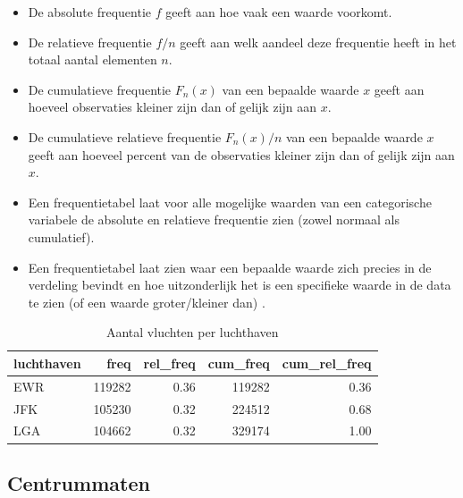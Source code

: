\documentclass[]{tufte-book}
\providecommand{\tightlist}{%
  \setlength{\itemsep}{0pt}\setlength{\parskip}{0pt}}
\begin{document}
\begin{itemize}
\tightlist
\item
  De absolute frequentie \(f\) geeft aan hoe vaak een waarde voorkomt.
\item
  De relatieve frequentie \(f/n\) geeft aan welk aandeel deze frequentie heeft in het totaal aantal elementen \(n\).
\item
  De cumulatieve frequentie \(F_n(x)\) van een bepaalde waarde \(x\) geeft aan hoeveel observaties kleiner zijn dan of gelijk zijn aan \(x\).
\item
  De cumulatieve relatieve frequentie \(F_n(x)/n\) van een bepaalde waarde \(x\) geeft aan hoeveel percent van de observaties kleiner zijn dan of gelijk zijn aan \(x\).
\item
  Een frequentietabel laat voor alle mogelijke waarden van een categorische variabele de absolute en relatieve frequentie zien (zowel normaal als cumulatief).
\item
  Een frequentietabel laat zien waar een bepaalde waarde zich precies in de verdeling bevindt en hoe uitzonderlijk het is een specifieke waarde in de data te zien (of een waarde groter/kleiner dan) .
\end{itemize}

\begin{table}

\caption{\label{tab:4-4}Aantal vluchten per luchthaven}
\centering
\fontsize{10}{12}\selectfont
\begin{tabular}[t]{lrrrr}
\toprule
luchthaven & freq & rel\_freq & cum\_freq & cum\_rel\_freq\\
\midrule
EWR & 119282 & 0.36 & 119282 & 0.36\\
JFK & 105230 & 0.32 & 224512 & 0.68\\
LGA & 104662 & 0.32 & 329174 & 1.00\\
\bottomrule
\end{tabular}
\end{table}

\hypertarget{centrummaten-1}{%
\subsection*{Centrummaten}\label{centrummaten-1}}
\end{document}
